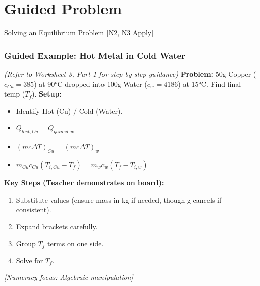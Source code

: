 \documentclass[xcolor=svgnames]{beamer}
\begin{document}
\section{Guided Problem}
\begin{frame}{Solving an Equilibrium Problem [N2, N3 Apply]}
    \frametitle{Guided Example: Hot Metal in Cold Water}
    \textit{(Refer to Worksheet 3, Part 1 for step-by-step guidance)}
    \vspace{1em}
    \textbf{Problem:} 50g Copper ($c_{Cu} = 385$) at 90°C dropped into 100g Water ($c_{w} = 4186$) at 15°C. Find final temp ($T_f$).
    \vspace{1em}
    \textbf{Setup:}
    \begin{itemize}
        \item Identify Hot (Cu) / Cold (Water).
        \item $Q_{lost, Cu} = Q_{gained, w}$
        \item $(mc\Delta T)_{Cu} = (mc\Delta T)_{w}$
        \item $m_{Cu}c_{Cu}(T_{i,Cu} - T_f) = m_w c_w (T_f - T_{i,w})$
    \end{itemize}
    \vspace{1em}
    \textbf{Key Steps (Teacher demonstrates on board):}
    \begin{enumerate}
        \item Substitute values (ensure mass in kg if needed, though g cancels if consistent).
        \item Expand brackets carefully.
        \item Group $T_f$ terms on one side.
        \item Solve for $T_f$.
    \end{enumerate}
    \textit{[Numeracy focus: Algebraic manipulation]}
\end{frame}
\end{document}
